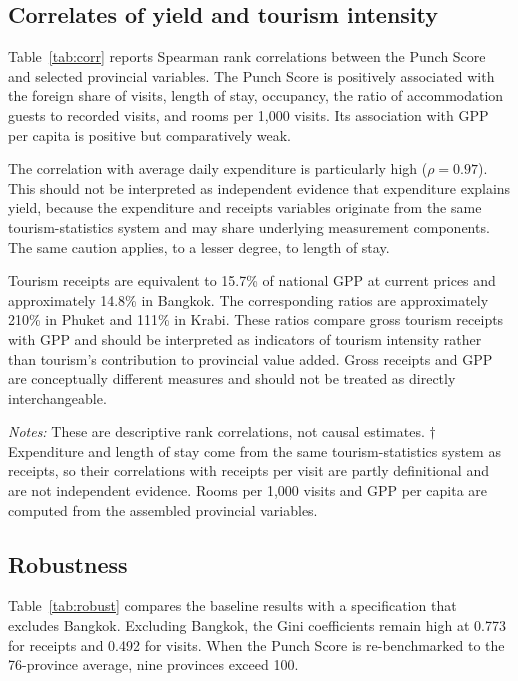 \documentclass[11pt,a4paper]{article}
\theoremstyle{plain}\newtheorem{proposition}{Proposition}
\theoremstyle{definition}\newtheorem{definition}{Definition}
\begin{document}
\subsection{Correlates of yield and tourism intensity}
Table~\ref{tab:corr} reports Spearman rank correlations between the Punch Score and selected provincial variables. The Punch Score is positively associated with the foreign share of visits, length of stay, occupancy, the ratio of accommodation guests to recorded visits, and rooms per 1,000 visits. Its association with GPP per capita is positive but comparatively weak.

The correlation with average daily expenditure is particularly high ($\rho=0.97$). This should not be interpreted as independent evidence that expenditure explains yield, because the expenditure and receipts variables originate from the same tourism-statistics system and may share underlying measurement components. The same caution applies, to a lesser degree, to length of stay.

Tourism receipts are equivalent to 15.7\% of national GPP at current prices and approximately 14.8\% in Bangkok. The corresponding ratios are approximately 210\% in Phuket and 111\% in Krabi. These ratios compare gross tourism receipts with GPP and should be interpreted as indicators of tourism intensity rather than tourism's contribution to provincial value added. Gross receipts and GPP are conceptually different measures and should not be treated as directly interchangeable.

\begin{table}[t]\centering\small
\caption{Spearman rank correlations with the Punch Score, 2024}\label{tab:corr}
\resizebox{\textwidth}{!}{}\par\smallskip
\parbox{\textwidth}{\scriptsize\emph{Notes:} These are descriptive rank correlations, not causal estimates. $\dagger$ Expenditure and length of stay come from the same tourism-statistics system as receipts, so their correlations with receipts per visit are partly definitional and are not independent evidence. Rooms per 1,000 visits and GPP per capita are computed from the assembled provincial variables.}
\end{table}

\subsection{Robustness}\label{sec:robust}
Table~\ref{tab:robust} compares the baseline results with a specification that excludes Bangkok. Excluding Bangkok, the Gini coefficients remain high at 0.773 for receipts and 0.492 for visits. When the Punch Score is re-benchmarked to the 76-province average, nine provinces exceed 100.
\end{document}
